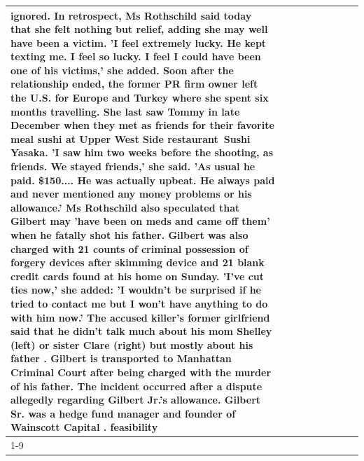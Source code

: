 \begin{table}[H]
\begin{tabular}{lllrlllll}
ignored. In retrospect, Ms Rothschild said today that she felt nothing but relief, adding she may well have been a victim. 'I feel extremely lucky. He kept texting me. I feel so lucky. I feel I could have been one of his victims,' she added. Soon after the relationship ended, the former PR firm owner left the U.S. for Europe and Turkey where she spent six months  travelling. She last saw Tommy in late December when they met as friends for their favorite meal sushi at Upper West Side restaurant Sushi Yasaka. 'I saw him two weeks before the shooting, as friends. We stayed friends,' she said. 'As usual he paid. \$150.... He was actually upbeat. He always paid and never mentioned any money problems or his allowance.' Ms Rothschild also speculated that Gilbert may 'have been on meds and came off them' when he fatally shot his father. Gilbert was also charged with 21 counts of criminal possession of forgery devices after skimming device and 21 blank credit cards found at his home on Sunday. 'I've cut ties now,' she added: 'I wouldn’t be surprised if he tried to contact me but I won’t have anything to do with him now.' The accused killer's former girlfriend said that he didn't talk much about his mom Shelley (left) or sister Clare (right) but mostly about his father . Gilbert is transported to Manhattan Criminal Court  after being charged with the murder of his father. The incident occurred after a dispute allegedly regarding Gilbert Jr.'s allowance. Gilbert Sr. was a hedge fund manager and founder of Wainscott Capital . feasibility \\
\cline{1-9}

\end{tabular}
\end{table}
